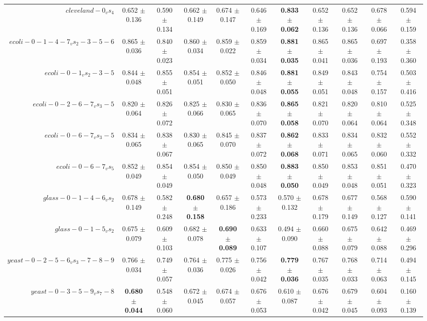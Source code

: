 \begin{table}[!ht]
{\begin{tabular}{r c c c c c c c c c c}
$cleveland-0_vs_4$ & 0.652 $\pm$ 0.136 & 0.590 $\pm$ 0.134 & 0.662 $\pm$ 0.149 & 0.674 $\pm$ 0.147 & 0.646 $\pm$ 0.169 & \textbf{0.833 $\pm$ 0.062} & 0.652 $\pm$ 0.136 & 0.652 $\pm$ 0.136 & 0.678 $\pm$ 0.066 & 0.594 $\pm$ 0.159 \\
$ecoli-0-1-4-7_vs_2-3-5-6$ & 0.865 $\pm$ 0.036 & 0.840 $\pm$ 0.023 & 0.860 $\pm$ 0.034 & 0.859 $\pm$ 0.022 & 0.859 $\pm$ 0.034 & \textbf{0.881 $\pm$ 0.035} & 0.865 $\pm$ 0.041 & 0.865 $\pm$ 0.036 & 0.697 $\pm$ 0.193 & 0.358 $\pm$ 0.360 \\
$ecoli-0-1_vs_2-3-5$ & 0.844 $\pm$ 0.048 & 0.855 $\pm$ 0.051 & 0.854 $\pm$ 0.051 & 0.852 $\pm$ 0.050 & 0.846 $\pm$ 0.048 & \textbf{0.881 $\pm$ 0.055} & 0.849 $\pm$ 0.051 & 0.843 $\pm$ 0.048 & 0.754 $\pm$ 0.157 & 0.503 $\pm$ 0.416 \\
$ecoli-0-2-6-7_vs_3-5$ & 0.820 $\pm$ 0.064 & 0.826 $\pm$ 0.072 & 0.825 $\pm$ 0.066 & 0.830 $\pm$ 0.065 & 0.836 $\pm$ 0.070 & \textbf{0.865 $\pm$ 0.058} & 0.821 $\pm$ 0.070 & 0.820 $\pm$ 0.064 & 0.810 $\pm$ 0.064 & 0.525 $\pm$ 0.348 \\
$ecoli-0-6-7_vs_3-5$ & 0.834 $\pm$ 0.065 & 0.838 $\pm$ 0.067 & 0.830 $\pm$ 0.065 & 0.845 $\pm$ 0.070 & 0.837 $\pm$ 0.072 & \textbf{0.862 $\pm$ 0.068} & 0.833 $\pm$ 0.071 & 0.834 $\pm$ 0.065 & 0.832 $\pm$ 0.060 & 0.552 $\pm$ 0.332 \\
$ecoli-0-6-7_vs_5$ & 0.852 $\pm$ 0.049 & 0.854 $\pm$ 0.049 & 0.854 $\pm$ 0.050 & 0.850 $\pm$ 0.049 & 0.850 $\pm$ 0.048 & \textbf{0.883 $\pm$ 0.050} & 0.850 $\pm$ 0.049 & 0.853 $\pm$ 0.048 & 0.851 $\pm$ 0.051 & 0.470 $\pm$ 0.323 \\
$glass-0-1-4-6_vs_2$ & 0.678 $\pm$ 0.149 & 0.582 $\pm$ 0.248 & \textbf{0.680 $\pm$ 0.158} & 0.657 $\pm$ 0.186 & 0.573 $\pm$ 0.233 & 0.570 $\pm$ 0.132 & 0.678 $\pm$ 0.179 & 0.677 $\pm$ 0.149 & 0.568 $\pm$ 0.127 & 0.590 $\pm$ 0.141 \\
$glass-0-1-5_vs_2$ & 0.675 $\pm$ 0.079 & 0.609 $\pm$ 0.103 & 0.682 $\pm$ 0.078 & \textbf{0.690 $\pm$ 0.089} & 0.633 $\pm$ 0.107 & 0.494 $\pm$ 0.090 & 0.660 $\pm$ 0.088 & 0.675 $\pm$ 0.079 & 0.642 $\pm$ 0.088 & 0.469 $\pm$ 0.296 \\
$yeast-0-2-5-6_vs_3-7-8-9$ & 0.766 $\pm$ 0.034 & 0.749 $\pm$ 0.057 & 0.764 $\pm$ 0.036 & 0.775 $\pm$ 0.026 & 0.756 $\pm$ 0.042 & \textbf{0.779 $\pm$ 0.036} & 0.767 $\pm$ 0.035 & 0.768 $\pm$ 0.033 & 0.714 $\pm$ 0.063 & 0.494 $\pm$ 0.145 \\
$yeast-0-3-5-9_vs_7-8$ & \textbf{0.680 $\pm$ 0.044} & 0.548 $\pm$ 0.060 & 0.672 $\pm$ 0.045 & 0.674 $\pm$ 0.057 & 0.676 $\pm$ 0.053 & 0.610 $\pm$ 0.087 & 0.676 $\pm$ 0.042 & 0.679 $\pm$ 0.045 & 0.604 $\pm$ 0.093 & 0.160 $\pm$ 0.139 \\

\end{tabular}}
\end{table}

